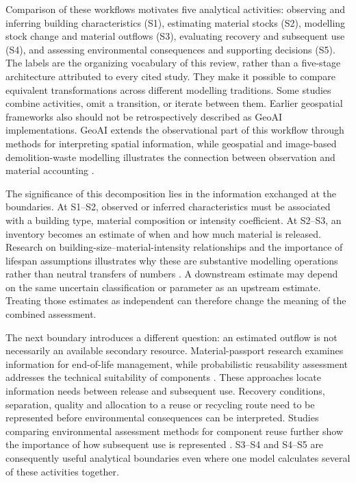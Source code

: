 Comparison of these workflows motivates five analytical activities: observing and inferring building characteristics (S1), estimating material stocks (S2), modelling stock change and material outflows (S3), evaluating recovery and subsequent use (S4), and assessing environmental consequences and supporting decisions (S5). The labels are the organizing vocabulary of this review, rather than a five-stage architecture attributed to every cited study. They make it possible to compare equivalent transformations across different modelling traditions. Some studies combine activities, omit a transition, or iterate between them. Earlier geospatial frameworks also should not be retrospectively described as GeoAI implementations. GeoAI extends the observational part of this workflow through methods for interpreting spatial information, while geospatial and image-based demolition-waste modelling illustrates the connection between observation and material accounting \citep{I08,U01}.

The significance of this decomposition lies in the information exchanged at the boundaries. At S1–S2, observed or inferred characteristics must be associated with a building type, material composition or intensity coefficient. At S2–S3, an inventory becomes an estimate of when and how much material is released. Research on building-size–material-intensity relationships and the importance of lifespan assumptions illustrates why these are substantive modelling operations rather than neutral transfers of numbers \citep{I13,U11}. A downstream estimate may depend on the same uncertain classification or parameter as an upstream estimate. Treating those estimates as independent can therefore change the meaning of the combined assessment.

The next boundary introduces a different question: an estimated outflow is not necessarily an available secondary resource. Material-passport research examines information for end-of-life management, while probabilistic reusability assessment addresses the technical suitability of components \citep{I20,I21}. These approaches locate information needs between release and subsequent use. Recovery conditions, separation, quality and allocation to a reuse or recycling route need to be represented before environmental consequences can be interpreted. Studies comparing environmental assessment methods for component reuse further show the importance of how subsequent use is represented \citep{I22}. S3–S4 and S4–S5 are consequently useful analytical boundaries even where one model calculates several of these activities together.

